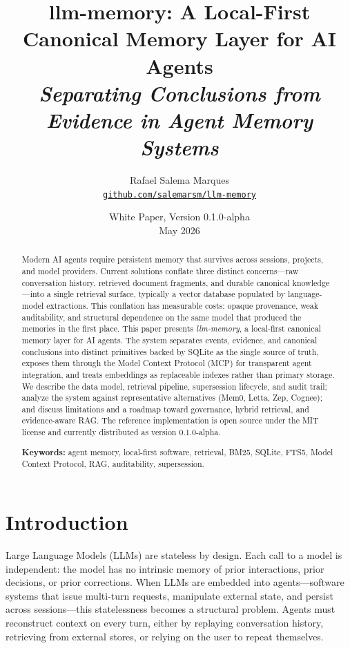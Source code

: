 \documentclass[11pt,a4paper]{article}
\title{
 \vspace{-1.5em}
 {\Huge\bfseries llm-memory: A Local-First Canonical Memory Layer for AI Agents}\\[0.6em]
 {\large\itshape Separating Conclusions from Evidence in Agent Memory Systems}
}
\author{
 Rafael Salema Marques\\
 \href{https://github.com/salemarsm/llm-memory}{\texttt{github.com/salemarsm/llm-memory}}
}
\date{White Paper, Version 0.1.0-alpha\\May 2026}
\begin{document}
\maketitle
\thispagestyle{fancy}

\begin{abstract}
\noindent
Modern AI agents require persistent memory that survives across sessions, projects, and model providers. Current solutions conflate three distinct concerns---raw conversation history, retrieved document fragments, and durable canonical knowledge---into a single retrieval surface, typically a vector database populated by language-model extractions. This conflation has measurable costs: opaque provenance, weak auditability, and structural dependence on the same model that produced the memories in the first place. This paper presents \textit{llm-memory}, a local-first canonical memory layer for AI agents. The system separates events, evidence, and canonical conclusions into distinct primitives backed by SQLite as the single source of truth, exposes them through the Model Context Protocol (MCP) for transparent agent integration, and treats embeddings as replaceable indexes rather than primary storage. We describe the data model, retrieval pipeline, supersession lifecycle, and audit trail; analyze the system against representative alternatives (Mem0, Letta, Zep, Cognee); and discuss limitations and a roadmap toward governance, hybrid retrieval, and evidence-aware RAG. The reference implementation is open source under the MIT license and currently distributed as version 0.1.0-alpha.

\vspace{0.6em}
\noindent\textbf{Keywords:} agent memory, local-first software, retrieval, BM25, SQLite, FTS5, Model Context Protocol, RAG, auditability, supersession.
\end{abstract}

\vspace{1em}

\section{Introduction}

Large Language Models (LLMs) are stateless by design. Each call to a model is independent: the model has no intrinsic memory of prior interactions, prior decisions, or prior corrections. When LLMs are embedded into agents---software systems that issue multi-turn requests, manipulate external state, and persist across sessions---this statelessness becomes a structural problem. Agents must reconstruct context on every turn, either by replaying conversation history, retrieving from external stores, or relying on the user to repeat themselves.
\end{document}

